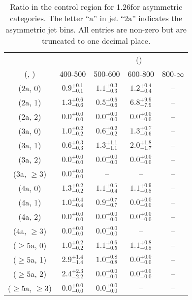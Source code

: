 \begin{table}[h!]
\tiny
\centering
\caption{Ratio in the \gj control region for 1.26\ifb for asymmetric categories. The letter ``a'' in jet \eg ``2a''  indicates the asymmetric jet bins. All entries are non-zero but are truncated to one decimal place.\label{tab:ratiosep_gj_ewk_asym}}
\begin{tabular}
{ccccc}
	\hline\hline
&	& \multicolumn{4}{c}{\scalht (\gev)} \\ 
	 (\njet,  \nb) & 400-500 & 500-600 & 600-800 & 800-$\infty$ \\ [0.8ex] 
\hline
	(2a, 0) & $0.9^{+ 0.1 }_{- 0.1 }$ & $1.1^{+ 0.3 }_{- 0.3 }$ & $1.2^{+ 0.4 }_{- 0.4 }$ & -- \\[0.5ex] 
	(2a, 1) & $1.3^{+ 0.6 }_{- 0.6 }$ & $0.5^{+ 0.6 }_{- 0.6 }$ & $6.8^{+ 9.9 }_{- 7.9 }$ & -- \\[0.5ex] 
	(2a, 2) & $0.0^{+ 0.0 }_{- 0.0 }$ & $0.0^{+ 0.0 }_{- 0.0 }$ & $0.0^{+ 0.0 }_{- 0.0 }$ & -- \\[0.5ex] 
	(3a, 0) & $1.0^{+ 0.2 }_{- 0.2 }$ & $0.6^{+ 0.2 }_{- 0.2 }$ & $1.3^{+ 0.7 }_{- 0.6 }$ & -- \\[0.5ex] 
	(3a, 1) & $0.6^{+ 0.3 }_{- 0.3 }$ & $1.3^{+ 1.1 }_{- 1.1 }$ & $2.0^{+ 1.8 }_{- 1.7 }$ & -- \\[0.5ex] 
	(3a, 2) & $0.0^{+ 0.0 }_{- 0.0 }$ & $0.0^{+ 0.0 }_{- 0.0 }$ & $0.0^{+ 0.0 }_{- 0.0 }$ & -- \\[0.5ex] 
	(3a, $\ge3$) & $0.0^{+ 0.0 }_{- 0.0 }$ & -- & -- & -- \\[0.5ex] 
	(4a, 0) & $1.3^{+ 0.2 }_{- 0.2 }$ & $1.1^{+ 0.5 }_{- 0.4 }$ & $1.1^{+ 0.9 }_{- 0.8 }$ & -- \\[0.5ex] 
	(4a, 1) & $1.0^{+ 0.4 }_{- 0.4 }$ & $0.9^{+ 0.7 }_{- 0.7 }$ & $0.0^{+ 0.0 }_{- 0.0 }$ & -- \\[0.5ex] 
	(4a, 2) & $0.0^{+ 0.0 }_{- 0.0 }$ & $0.0^{+ 0.0 }_{- 0.0 }$ & $0.0^{+ 0.0 }_{- 0.0 }$ & -- \\[0.5ex] 
	(4a, $\ge3$) & $0.0^{+ 0.0 }_{- 0.0 }$ & $0.0^{+ 0.0 }_{- 0.0 }$ & -- & -- \\[0.5ex] 
	($\ge5$a, 0) & $1.0^{+ 0.2 }_{- 0.2 }$ & $1.1^{+ 0.6 }_{- 0.5 }$ & $1.1^{+ 0.8 }_{- 0.8 }$ & -- \\[0.5ex] 
	($\ge5$a, 1) & $2.9^{+ 1.4 }_{- 1.4 }$ & $1.0^{+ 0.8 }_{- 0.8 }$ & $0.0^{+ 0.0 }_{- 0.0 }$ & -- \\[0.5ex] 
	($\ge5$a, 2) & $2.4^{+ 2.3 }_{- 2.2 }$ & $0.0^{+ 0.0 }_{- 0.0 }$ & $0.0^{+ 0.0 }_{- 0.0 }$ & -- \\[0.5ex] 
	($\ge5$a, $\ge3$) & $0.0^{+ 0.0 }_{- 0.0 }$ & $0.0^{+ 0.0 }_{- 0.0 }$ & -- & -- \\[0.5ex] 
	\hline
	\hline
\end{tabular}
\end{table}
